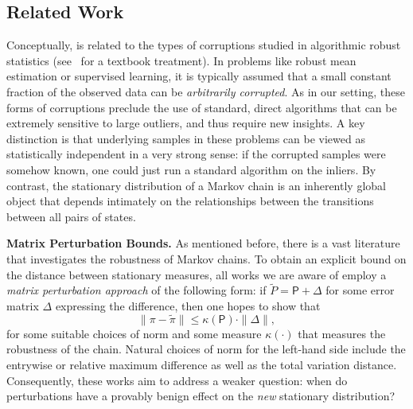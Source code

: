 \documentclass[11pt]{article}
\theoremstyle{remark}
\begin{document}
\subsection{Related Work}
\label{sec:related}

Conceptually,  is related to the types of corruptions studied in algorithmic robust statistics (see~\cite{diakonikolas2023algorithmic} for a textbook treatment). In problems like robust mean estimation or supervised learning, it is typically assumed that a small constant fraction of the observed data can be \emph{arbitrarily corrupted}. As in our setting, these forms of corruptions preclude the use of standard, direct algorithms that can be extremely sensitive to large outliers, and thus require new insights. A key distinction is that underlying samples in these problems can be viewed as statistically independent in a very strong sense: if the corrupted samples were somehow known, one could just run a standard algorithm on the inliers. By contrast, the stationary distribution of a Markov chain is an inherently global object that depends intimately on the relationships between the transitions between all pairs of states.

\textbf{Matrix Perturbation Bounds.} As mentioned before, there is a vast literature that investigates the robustness of Markov chains. To obtain an explicit bound on the distance between stationary measures, all works we are aware of employ a \emph{matrix perturbation approach} of the following form: if $\widetilde{P}=\mathsf{P}+\Delta$ for some error matrix $\Delta$ expressing the difference, then one hopes to show that
\begin{equation}
\label{eq:perturbation}
    \|\pi-\widetilde{\pi}\|\leq \kappa(\mathsf{P})\cdot\|\Delta\|,
\end{equation}
for some suitable choices of norm and some measure $\kappa(\cdot)$ that measures the robustness of the chain. Natural choices of norm for the left-hand side include the entrywise or relative maximum difference as well as the total variation distance. Consequently, these works aim to address a weaker question: when do perturbations have a provably benign effect on the \emph{new} stationary distribution?
\end{document}
